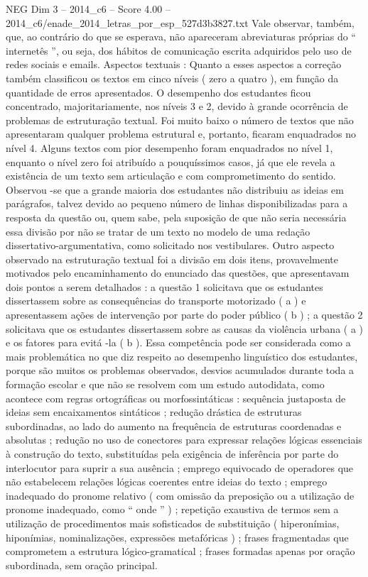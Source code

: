 \begin{textsample}{NEG Dim 3 – 2014\_c6 – Score 4.00 – 2014\_c6/enade\_2014\_letras\_por\_esp\_527d3b3827.txt}
Vale observar, também, que, ao contrário do que se esperava, não apareceram abreviaturas próprias do “ internetês ”, ou seja, dos hábitos de comunicação escrita adquiridos pelo uso de redes sociais e emails.
Aspectos textuais : Quanto a esses aspectos a correção também classificou os textos em cinco níveis ( zero a quatro ), em função da quantidade de erros apresentados.
O desempenho dos estudantes ficou concentrado, majoritariamente, nos níveis 3 e 2, devido à grande ocorrência de problemas de estruturação textual.
Foi muito baixo o número de textos que não apresentaram qualquer problema estrutural e, portanto, ficaram enquadrados no nível 4.
Alguns textos com pior desempenho foram enquadrados no nível 1, enquanto o nível zero foi atribuído a pouquíssimos casos, já que ele revela a existência de um texto sem articulação e com comprometimento do sentido.
Observou -se que a grande maioria dos estudantes não distribuiu as ideias em parágrafos, talvez devido ao pequeno número de linhas disponibilizadas para a resposta da questão ou, quem sabe, pela suposição de que não seria necessária essa divisão por não se tratar de um texto no modelo de uma redação dissertativo-argumentativa, como solicitado nos vestibulares.
Outro aspecto observado na estruturação textual foi a divisão em dois itens, provavelmente motivados pelo encaminhamento do enunciado das questões, que apresentavam dois pontos a serem detalhados : a questão 1 solicitava que os estudantes dissertassem sobre as consequências do transporte motorizado ( a ) e apresentassem ações de intervenção por parte do poder público ( b ) ; a questão 2 solicitava que os estudantes dissertassem sobre as causas da violência urbana ( a ) e os fatores para evitá -la ( b ).
Essa competência pode ser considerada como a mais problemática no que diz respeito ao desempenho linguístico dos estudantes, porque são muitos os problemas observados, desvios acumulados durante toda a formação escolar e que não se resolvem com um estudo autodidata, como acontece com regras ortográficas ou morfossintáticas : sequência justaposta de ideias sem encaixamentos sintáticos ; redução drástica de estruturas subordinadas, ao lado do aumento na frequência de estruturas coordenadas e absolutas ; redução no uso de conectores para expressar relações lógicas essenciais à construção do texto, substituídas pela exigência de inferência por parte do interlocutor para suprir a sua ausência ; emprego equivocado de operadores que não estabelecem relações lógicas coerentes entre ideias do texto ; emprego inadequado do pronome relativo ( com omissão da preposição ou a utilização de pronome inadequado, como “ onde ” ) ; repetição exaustiva de termos sem a utilização de procedimentos mais sofisticados de substituição ( hiperonímias, hiponímias, nominalizações, expressões metafóricas ) ; frases fragmentadas que comprometem a estrutura lógico-gramatical ; frases formadas apenas por oração subordinada, sem oração principal.

\end{textsample}
